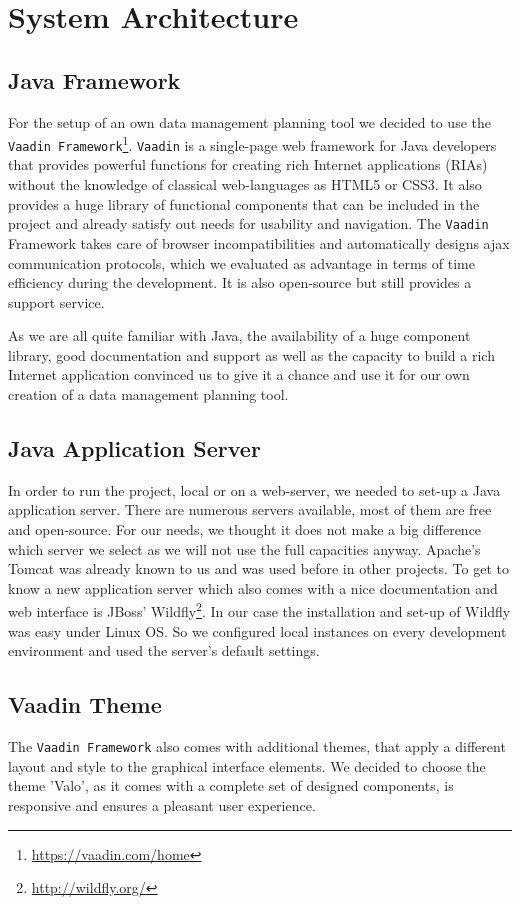 \section{System Architecture}
\subsection{Java Framework}
For the setup of an own data management planning tool we decided to use the \texttt{Vaadin Framework}\footnote{\url{https://vaadin.com/home}}. \texttt{Vaadin} is a single-page web framework for Java developers that provides powerful functions for creating rich Internet applications (RIAs) without the knowledge of classical web-languages as HTML5 or CSS3. It also provides a huge library of functional components that can be included in the project and already satisfy out needs for usability and navigation.
The \texttt{Vaadin} Framework takes care of browser incompatibilities and automatically designs ajax communication protocols, which we evaluated as advantage in terms of time efficiency during the development. It is also open-source but still provides a support service. 

As we are all quite familiar with Java, the availability of a huge component library, good documentation and support as well as the capacity to build a rich Internet application convinced us to give it a chance and use it for our own creation of a data management planning tool.

\subsection{Java Application Server}
In order to run the project, local or on a web-server, we needed to set-up a Java application server. There are numerous servers available, most of them are free and open-source. For our needs, we thought it does not make a big difference which server we select as we will not use the full capacities anyway. 
Apache's Tomcat was already known to us and was used before in other projects. To get to know a new application server which also comes with a nice documentation and web interface is JBoss' Wildfly\footnote{\url{http://wildfly.org/}}. 
In our case the installation and set-up of Wildfly was easy under Linux OS. So we configured local instances on every development environment and used the server's default settings.

\subsection{Vaadin Theme}
The \texttt{Vaadin Framework} also comes with additional themes, that apply a different layout and style to the graphical interface elements. We decided to choose the theme 'Valo', as it comes with a complete set of designed components, is responsive and ensures a pleasant user experience.